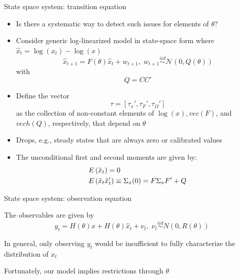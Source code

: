 \documentclass[handout,usepdftitle=false,xcolor=dvipsnames,aspectratio=169]{beamer}
\begin{document}
\renewcommand{\Source}{\textcite{Iskrev2010}}
\begin{frame}{State space system: transition equation}
  \begin{itemize}
    \item Is there a systematic way to detect such issues for elements of $\theta$?
    \item Consider generic log-linearized model in state-space form where $\hat x_t=\log(x_t)-\log(x)$
          \begin{equation}
            \hat x_{t + 1} = F(\theta) \hat x_t + w_{t + 1},\; w_{t + 1}\mathop  \sim \limits^{iid} \mathcal{N}\left(0,Q(\theta)\right)
          \end{equation}
          with
          \[
            Q=CC'
          \]
    \item Define the vector
          \begin{equation}
            \tau=\left[\tau_x',\tau_F',\tau_\Omega' \right]
          \end{equation}
          as the collection of non-constant elements of $\log(x),vec(F)$, and $vech(Q)$, respectively, that depend on $\theta$
    \item Drops, e.g., steady states that are always zero or calibrated values
    \item The unconditional first and second moments are given by:
          \[\begin{gathered}
              E\left( {{{\hat x}_t}} \right) = 0 \hfill \\
              E\left( {{{\hat x}_t}{{\hat x}_t}'} \right) \equiv {\Sigma _x(0)} = F{\Sigma _x}F' + Q \hfill \\
            \end{gathered} \]
  \end{itemize}
\end{frame}

\begin{frame}{State space system: observation equation}
  \begin{witemize}
    \item The observables are given by
    \begin{equation}
      y_t = H(\theta)x + H(\theta)\hat x_t + \nu_t, \; \nu _t\mathop  \sim \limits^{iid} N\left(0,R(\theta) \right)
    \end{equation}
    \item In general, only observing $y_t$ would be insufficient to fully characterize the distribution of $x_t$
    \item Fortunately, our model implies restrictions through $\theta$
  \end{witemize}
\end{frame}
\end{document}
